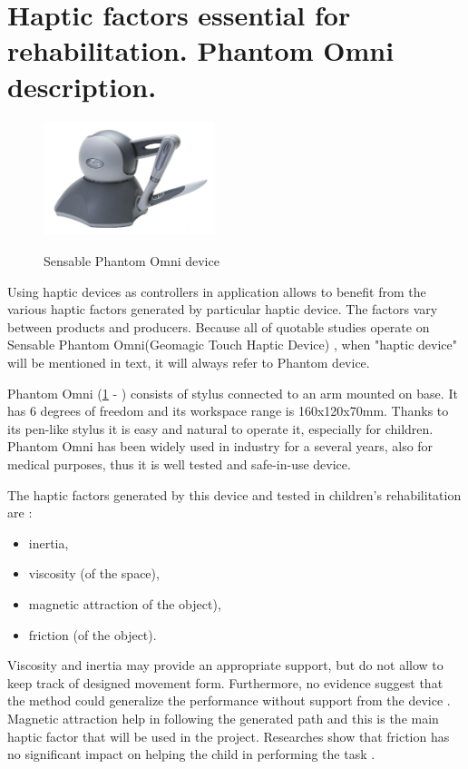 \section{Haptic factors essential for rehabilitation. Phantom Omni description.}
\label{phantom_introduction} 

\begin{figure}
\begin{center}
	\includegraphics[width=5cm]{Images/phantom_basic}
	\label{fig:phantom_basic}	
	\caption{Sensable Phantom Omni device}
\end{center}
\end{figure}
Using haptic devices as controllers in application allows to benefit from the various haptic factors generated by particular haptic device. The factors vary between products and producers. Because all of quotable studies operate on Sensable Phantom Omni(Geomagic Touch Haptic Device) \cite{8}, when "haptic device" will be mentioned in text, it will always refer to Phantom device. 

Phantom Omni (\ref{fig:phantom_basic} - ) consists of stylus connected to an arm mounted on base. It has 6 degrees of freedom and its workspace range is 160x120x70mm. Thanks to its pen-like stylus it is easy and natural to operate it, especially for children. Phantom Omni has been widely used in industry for a several years, also for medical purposes, thus it is well tested and safe-in-use device.

The haptic factors generated by this device and tested in children's rehabilitation are \cite{9} \cite {13}:
\begin{itemize} [noitemsep]
\item inertia,
\item viscosity (of the space),
\item magnetic attraction of the object),
\item friction  (of the object).
\end{itemize}
Viscosity and inertia may provide an appropriate support, but do not allow to keep track of designed movement form. Furthermore, no evidence suggest that the method could generalize the performance without support from the device \cite{9}. Magnetic attraction help in following the generated path and this is the main haptic factor that will be used in the project. Researches show that friction has no significant impact on helping the child in performing the task \cite{13}.

